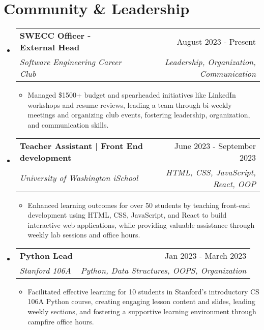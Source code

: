 \documentclass[letterpaper,11pt]{article}
\makeatletter
\newcommand{\resumeItem}[1]{
  \item\small{
    {#1 \vspace{-2pt}}
  }
}
\newcommand{\resumeSubheading}[4]{
  \vspace{-2pt}\item
    \begin{tabular*}{0.97\textwidth}[t]{l@{\extracolsep{\fill}}r}
      \textbf{#1} & #2 \\
      \textit{\small#3} & \textit{\small #4} \\
    \end{tabular*}\vspace{-7pt}
}
\newcommand{\resumeSubHeadingListStart}{\begin{itemize}[leftmargin=0.15in, label={}]}
\newcommand{\resumeSubHeadingListEnd}{\end{itemize}}
\newcommand{\resumeItemListStart}{\begin{itemize}}
\newcommand{\resumeItemListEnd}{\end{itemize}\vspace{-5pt}}
\makeatother
\begin{document}
\section{Community \& Leadership}

\resumeSubHeadingListStart

\resumeSubheading
{SWECC Officer - External Head}{August 2023 - Present}
{Software Engineering Career Club}{Leadership, Organization, Communication}
\resumeItemListStart
    \resumeItem{Managed \$1500+ budget and spearheaded initiatives like LinkedIn workshops and resume reviews, leading a team through bi-weekly meetings and organizing club events, fostering leadership, organization, and communication skills.}
\resumeItemListEnd

\resumeSubheading{Teacher Assistant | Front End development }{June 2023 - September 2023}{University of Washington iSchool}{HTML, CSS, JavaScript, React, OOP}
\resumeItemListStart
\resumeItem{Enhanced learning outcomes for over 50 students by teaching front-end development using HTML, CSS, JavaScript, and React to build interactive web applications, while providing valuable assistance through weekly lab sessions and office hours.}
\resumeItemListEnd

\resumeSubheading
{Python Lead}{Jan 2023 - March 2023}
{Stanford 106A}{Python, Data Structures, OOPS, Organization}
\resumeItemListStart
\resumeItem{Facilitated effective learning for 10 students in Stanford's introductory CS 106A Python course, creating engaging lesson content and slides, leading weekly sections, and fostering a supportive learning environment through campfire office hours.}
\resumeItemListEnd

\resumeSubHeadingListEnd
\end{document}
